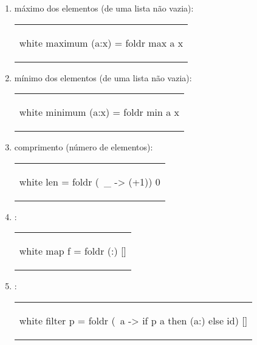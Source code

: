 \begin{enumerate}
\item máximo dos elementos (de uma lista não vazia):

\begin{center}
\begin{tabular}{l}
\begin{alg}{.5\textwidth}{white}
  maximum (a:x) = foldr max a x
\end{alg}
\end{tabular}
\end{center}

\item mínimo dos elementos (de uma lista não vazia):

\begin{center}
\begin{tabular}{l}
\begin{alg}{.5\textwidth}{white}
  minimum (a:x) = foldr min a x
\end{alg}
\end{tabular}
\end{center}

\item comprimento (número de elementos):

\begin{center}
\begin{tabular}{l}
\begin{alg}{.45\textwidth}{white}
  len = foldr (\ _ -> (+1)) 0
\end{alg}
\end{tabular}
\end{center}

\item \map:

\begin{center}
\begin{tabular}{l}
\begin{alg}{.4\textwidth}{white}
  map f = foldr (:) []
\end{alg}
\end{tabular}
\end{center}
  
\item \filter:

\begin{center}
\begin{tabular}{l}
\begin{alg}{.8\textwidth}{white}
  filter p = foldr (\ a -> if p a then (a:) else id) []
\end{alg}
\end{tabular}
\end{center}

\end{enumerate}


